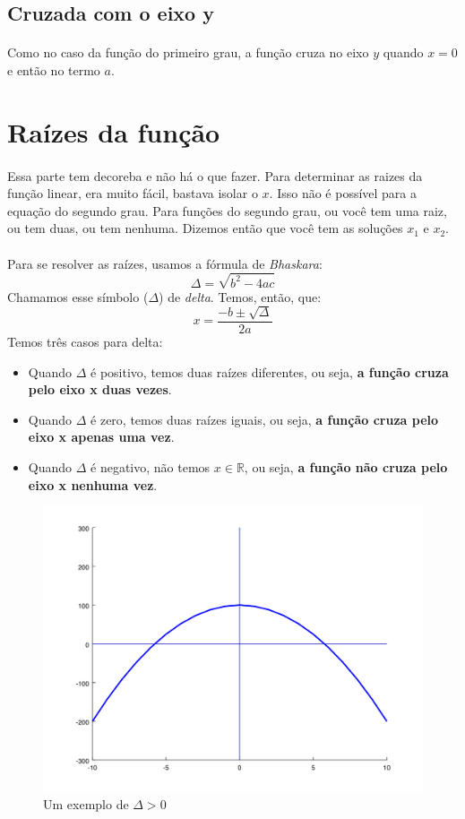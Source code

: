 \documentclass[11pt]{article}
\begin{document}
\subsection{Cruzada com o eixo y}
\paragraph{}
Como no caso da função do primeiro grau, a função cruza no eixo $y$ quando
$x = 0$ e então no termo $a$.

\section{Raízes da função}
\paragraph{}
Essa parte tem decoreba e não há o que fazer.
Para determinar as raizes da função linear, era muito fácil, bastava
isolar o $x$. Isso não é possível para a equação do segundo grau. 
Para funções do segundo grau, ou você tem uma raiz, ou tem duas, ou tem 
nenhuma. Dizemos então que você tem as soluções $x_1$ e $x_2$.
\paragraph{}
Para se resolver as raízes, usamos a fórmula de \textit{Bhaskara}:
$$\Delta = \sqrt{b^2 - 4ac}$$
Chamamos esse símbolo ($\Delta$) de \emph{delta}.
Temos, então, que:
$$x = \frac{-b \pm \sqrt{\Delta}}{2a}$$
\newpage
Temos três casos para delta:
\begin{itemize}
	\item Quando $\Delta$ é positivo, temos duas raízes diferentes, ou seja,
		\textbf{a função cruza pelo eixo x duas vezes}.
	\item Quando $\Delta$ é zero, temos duas raízes iguais, ou seja,
		\textbf{a função cruza pelo eixo x apenas uma vez}.
	\item Quando $\Delta$ é negativo, não temos $x \in \mathbb{R}$, ou seja,
		\textbf{a função não cruza pelo eixo x nenhuma vez}.
\end{itemize}

\begin{figure}[H]
	\centering
	\includegraphics[width=0.8\linewidth]{imgs2/chart5.png}
	\caption{Um exemplo de $\Delta > 0$}
\end{figure}
\end{document}
